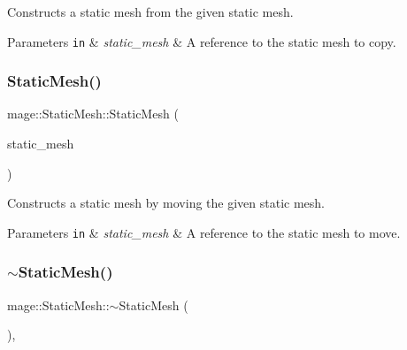 Constructs a static mesh from the given static mesh.


\begin{DoxyParams}[1]{Parameters}
\mbox{\tt in}  & {\em static\+\_\+mesh} & A reference to the static mesh to copy. \\
\hline
\end{DoxyParams}
\hypertarget{classmage_1_1_static_mesh_a4b3fab6fc753dc32d91bd8260ba3828f}{}\label{classmage_1_1_static_mesh_a4b3fab6fc753dc32d91bd8260ba3828f} 
\subsubsection{\texorpdfstring{Static\+Mesh()}{StaticMesh()}\hspace{0.1cm}{\footnotesize\ttfamily [4/4]}}
{\footnotesize\ttfamily mage\+::\+Static\+Mesh\+::\+Static\+Mesh (\begin{DoxyParamCaption}\item[{\hyperlink{classmage_1_1_static_mesh}{Static\+Mesh} \&\&}]{static\+\_\+mesh }\end{DoxyParamCaption})\hspace{0.3cm}{\ttfamily [default]}}

Constructs a static mesh by moving the given static mesh.


\begin{DoxyParams}[1]{Parameters}
\mbox{\tt in}  & {\em static\+\_\+mesh} & A reference to the static mesh to move. \\
\hline
\end{DoxyParams}
\hypertarget{classmage_1_1_static_mesh_a7fbae949f631d29913193a1b2c2ef658}{}\label{classmage_1_1_static_mesh_a7fbae949f631d29913193a1b2c2ef658} 
\subsubsection{\texorpdfstring{$\sim$\+Static\+Mesh()}{~StaticMesh()}}
{\footnotesize\ttfamily mage\+::\+Static\+Mesh\+::$\sim$\+Static\+Mesh (\begin{DoxyParamCaption}{ }\end{DoxyParamCaption})\hspace{0.3cm}{\ttfamily [virtual]}, {\ttfamily [default]}}

